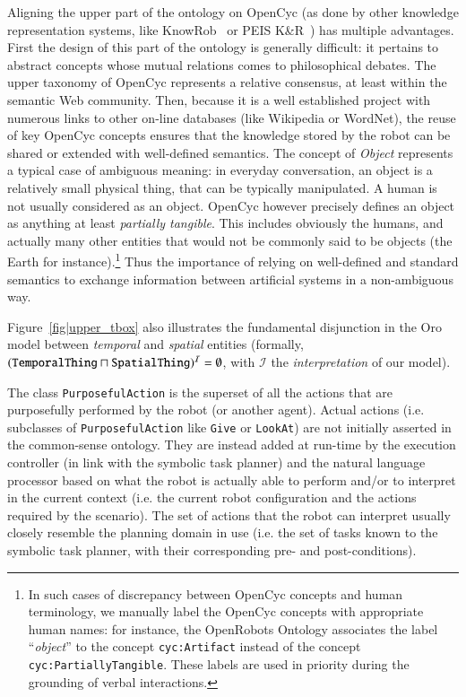 \documentclass[preprint,3p,times]{elsarticle}
\newcommand{\concept}[1]{{\small \texttt{#1}}}
\newcommand{\ie}{i.e.\xspace}
\begin{document}
Aligning the upper part of the ontology on {\sc OpenCyc} (as done by other
knowledge representation systems, like {\sc KnowRob}~\cite{Tenorth2009a} or PEIS
K\&R~\cite{daoutis2012cooperative}) has multiple advantages. First the design of
this part of the ontology is generally difficult: it pertains to abstract
concepts whose mutual relations comes to philosophical debates. The upper
taxonomy of {\sc OpenCyc} represents a relative consensus, at least within the
semantic Web community. Then, because it is a well established project with
numerous links to other on-line databases (like Wikipedia or WordNet), the reuse
of key {\sc OpenCyc} concepts ensures that the knowledge stored by the robot can
be shared or extended with well-defined semantics. The concept of \emph{Object}
represents a typical case of ambiguous meaning: in everyday conversation, an
object is a relatively small physical thing, that can be typically manipulated.
A human is not usually considered as an object. {\sc OpenCyc} however precisely
defines an object as anything at least \emph{partially tangible}. This includes
obviously the humans, and actually many other entities that would not be
commonly said to be objects (the Earth for instance).\footnote{In such cases of
discrepancy between {\sc OpenCyc} concepts and human terminology, we manually
label the {\sc OpenCyc} concepts with appropriate human names: for instance, the
OpenRobots Ontology associates the label ``\emph{object}'' to the concept
\concept{cyc:Artifact} instead of the concept \concept{cyc:PartiallyTangible}.
These labels are used in priority during the grounding of verbal interactions.}
Thus the importance of relying on well-defined and standard semantics to
exchange information between artificial systems in a non-ambiguous way.

Figure~\ref{fig|upper_tbox} also illustrates the fundamental disjunction
in the {\sc Oro} model between \emph{temporal} and \emph{spatial} entities (formally,
$(\text{\tt TemporalThing} \sqcap \text{\tt SpatialThing})^{\mathcal{I}} = \emptyset$, with
$\mathcal{I}$ the \emph{interpretation} of our model).

The class \concept{PurposefulAction} is the superset of all the actions that are
purposefully performed by the robot (or another agent). Actual actions (\ie
subclasses of \concept{PurposefulAction} like \concept{Give} or
\concept{LookAt}) are not initially asserted in the common-sense ontology. They
are instead added at run-time by the execution controller (in link with the
symbolic task planner) and the natural language processor based on what the
robot is actually able to perform and/or to interpret in the current context
(\ie the current robot configuration and the actions required by the scenario).
The set of actions that the robot can interpret usually closely resemble the
planning domain in use (\ie the set of tasks known to the symbolic task planner,
with their corresponding pre- and post-conditions).
\end{document}
